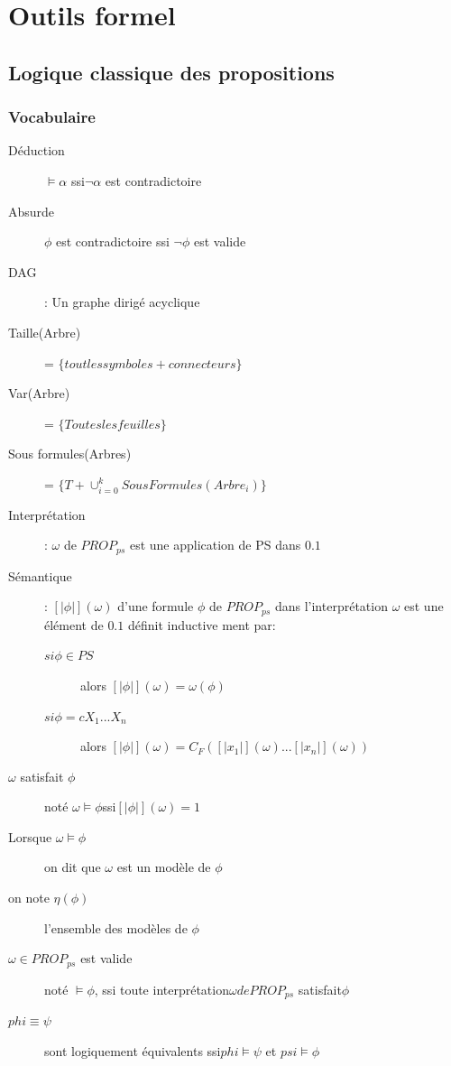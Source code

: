 \part{Outils formel}
\pagebreak

\chapter{Logique classique des propositions}
\section{Vocabulaire}

\begin{description}
\item[Déduction] $\models \alpha$ ssi$ \neg \alpha$ est contradictoire
\item[Absurde] $\phi$ est contradictoire ssi $\neg \phi$ est valide
\item[DAG]: Un graphe dirigé acyclique
\item[Taille(Arbre)] = $\{ tout les symboles + connecteurs \}$
\item[Var(Arbre)] = $\{ Toutes les feuilles \}$
\item[Sous formules(Arbres)] = $\{ T + \cup_{i=0}^k SousFormules(Arbre_i) \}$
\item[Interprétation]: $\omega$ de $PROP_{ps}$ est une application de PS dans ${0.1}$
\item[Sémantique]: $[| \phi |](\omega)$ d'une formule $\phi$ de $PROP_{ps}$ dans l'interprétation $\omega$ est une élément de ${0.1}$ définit inductive ment par:
\begin{description}
\item[$si \phi \in PS$] alors $[|\phi|](\omega) = \omega(\phi)$
\item[$si \phi = cX_1 ... X_n$] alors $[|\phi|](\omega) = C_F([|x_1|](\omega) ... [|x_n|](\omega))$
\end{description}
\item[$\omega $ satisfait $ \phi$] noté $\omega \models \phi $ssi$ [|\phi|](\omega) = 1$
\item[Lorsque $\omega \models \phi$] on dit que $\omega$ est un modèle de $\phi$
\item[on note $\eta(\phi)$] l'ensemble des modèles de $\phi$
\item[$\omega \in PROP_{ps}$ est valide] noté $\models \phi$, ssi toute interprétation$ \omega de PROP_{ps}$ satisfait$ \phi$
\item[$phi \equiv \psi$] sont logiquement équivalents ssi$ phi \models \psi$ et $psi \models \phi$
\end{description}

